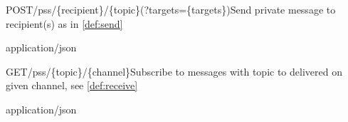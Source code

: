 
\begin{apiRoute}{POST}{/pss/\{recipient\}/\{topic\}(?targets=\{targets\})}{Send private message to recipient(s) as in \ref{def:send}}
{
}
{ }

\begin{routeParameter} 
\end{routeParameter}
\begin{routeResponse}{application/json}
\end{routeResponse}
\end{apiRoute}




\begin{apiRoute}{GET}{/pss/\{topic\}/\{channel\}}{Subscribe to messages with topic to delivered on given channel, see \ref{def:receive}}
{
}
{ }

\begin{routeParameter} 
\end{routeParameter}
\begin{routeResponse}{application/json}
\end{routeResponse}
\end{apiRoute}